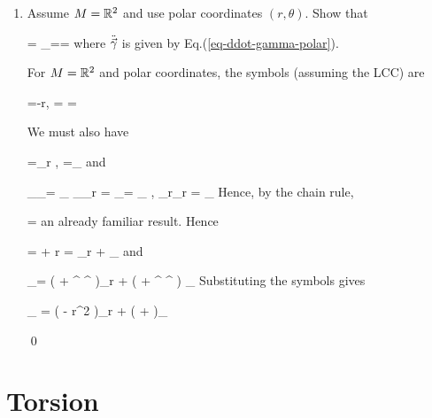 \begin{enumerate}
\qed

\item

\begin{claim}
Assume $M={ \mathbb{R}}^2$ and use polar coordinates $(r, \theta)$. 
Show that

\beq
{}=
\nnabla_{\dot{\vgamma}}\dot{\vgamma}=\ddot{\vgamma}=
\eeq
where $\ddot{{\vec{\gamma}}}$
is given by Eq.(\ref{eq-ddot-gamma-polar}).

\end{claim}
\proof


For $M={ \mathbb{R}}^2$
and polar coordinates,
the \Chris symbols (assuming the LCC) are

\beq
\Gamma{}=-r,\quad
\Gamma{}=
\Gamma{}=
\eeq

We must also have

\beq
\hatr=\vecpartial_r
,\quad
\htheta=\vecpartial_\theta
\eeq
and

\beq
\nnabla_\mu \vecpartial_\nu= 
\Gamma\indices{^\rho_{\mu\nu}}
\vecpartial_\rho
\implies
\nnabla_\theta\vecpartial_r = \Gamma{}
\vecpartial_\theta=
\vecpartial_\theta
,\quad
\nnabla_r\vecpartial_r = \Gamma{}
\vecpartial_
\eeq
Hence, by the chain rule,

\beq
\dot{\hatr}= \dot{\theta}\htheta
\eeq
an already familiar result. Hence


\beq
\dot{\hatr}=
\hatr
+
r\dot{\theta}
\htheta
=
\vecpartial_r
+
\dot{\theta}
\vecpartial_\theta
\eeq
and

\beq
\nnabla_{\dot{\vgamma}}\dot{\vgamma}=
\left(
+
\Gamma{}
^\mu
{}^\nu
\right)\vecpartial_r
+
\left(
\ddot{\theta}
+
\Gamma\indices{^\theta_{\mu\nu }}
^\mu
{}^\nu
\right)
\vecpartial_\theta
\eeq
Substituting the \Chris symbols gives

\beq
\nnabla_{\dot{\vgamma}}
\dot{\vgamma}=
\left(
-
r\dot{\theta}^2
\right)\vecpartial_r
+
\left(
\ddot{\theta}
+
\right)\vecpartial_\theta
\eeq


\qed


\end{enumerate}



\section{Torsion}

